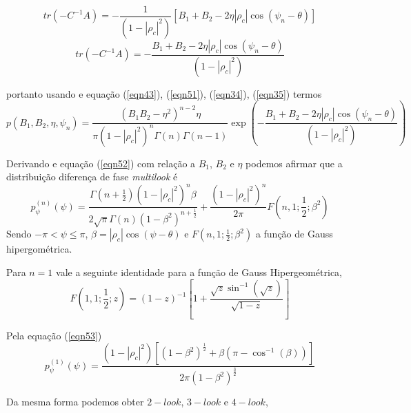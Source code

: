 \documentclass[12pt,a4paper]{article}
\begin{document}
{\footnotesize
\begin{equation}\label{eqn50}
	tr(-C^{-1}A)=-\frac{1}{(1-|\rho_c|^2)}\left[B_1+B_2-2\eta |\rho_c |\cos(\psi_n-\theta)\right]
\end{equation}}
{\footnotesize
\begin{equation}\label{eqn51}
	tr(-C^{-1}A)=-\frac{B_1+B_2-2\eta |\rho_c|\cos(\psi_n-\theta)}{(1-|\rho_c|^2)}
\end{equation}}

portanto usando e equação (\ref{eqn43}), (\ref{eqn51}),   (\ref{eqn34}), (\ref{eqn35}) termos   
{\footnotesize
\begin{equation}\label{eqn52}
	p(B_1,B_2,\eta,\psi_n)=\frac{\left(B_1B_2-\eta^2\right)^{n-2}\eta}{\pi(1-|\rho_c|^2)^{n}\Gamma(n)\Gamma(n-1)}\exp\left(-\frac{B_1+B_2-2\eta |\rho_c |\cos(\psi_n-\theta)}{(1-|\rho_c|^2)}\right)
\end{equation}}

Derivando e equação (\ref{eqn52}) com relação a $B_1$, $B_2$ e $\eta$ podemos afirmar que a distribuição diferença de fase {\it multilook} é 
\begin{equation}\label{eqn53}
	p_{\psi}^{(n)}(\psi)=\frac{\Gamma(n+\frac{1}{2})(1-|\rho_c|^2)^n\beta}{2\sqrt{\pi}\Gamma(n)(1-\beta^2)^{n+\frac{1}{2}}}+\frac{(1-|\rho_c|^2)^n}{2\pi}F(n,1;\frac{1}{2};\beta^2)
\end{equation}
Sendo $-\pi<\psi\leq\pi$, $\beta=|\rho_c|\cos(\psi-\theta)$ e $F(n,1;\frac{1}{2};\beta^2)$ a função de Gauss hipergométrica.

Para $n=1$  vale a seguinte identidade para a função de Gauss Hipergeométrica,
\begin{equation}\label{eqn54}
	F(1,1;\frac{1}{2};z)=(1-z)^{-1}\left[1+\frac{\sqrt{z}\sin^{-1}(\sqrt{z})}{\sqrt{1-z}}\right]
\end{equation}

Pela equação (\ref{eqn53})
\begin{equation}\label{eqn55}
	p_{\psi}^{(1)}(\psi)=\frac{(1-|\rho_c|^2)[(1-\beta^{2})^{\frac{1}{2}}+\beta(\pi-\cos^{-1}(\beta))]}{2\pi(1-\beta^{2})^{\frac{3}{2}}}
\end{equation}

Da mesma forma podemos obter $2-look$, $3-look$ e $4-look$,
\end{document}
